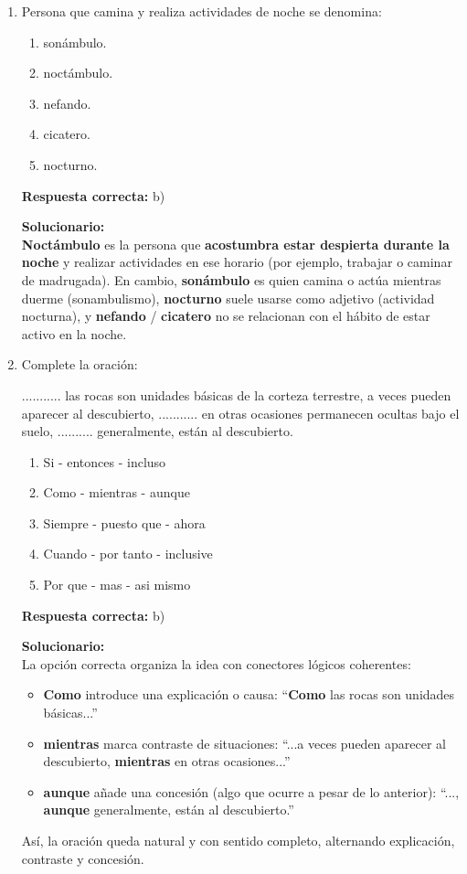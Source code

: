 \begin{enumerate}

\item Persona que camina y realiza actividades de noche se denomina:
\begin{enumerate}[label=\alph*)]
	\item sonámbulo.
	\item noctámbulo.
	\item nefando.
	\item cicatero.
	\item nocturno.
\end{enumerate}

\textbf{Respuesta correcta:} b)

\vspace{2mm}
\textbf{Solucionario:}\\
\textbf{Noctámbulo} es la persona que \textbf{acostumbra estar despierta durante la noche} y realizar actividades en ese horario (por ejemplo, trabajar o caminar de madrugada). 
En cambio, \textbf{sonámbulo} es quien camina o actúa mientras duerme (sonambulismo), \textbf{nocturno} suele usarse como adjetivo (actividad nocturna), y \textbf{nefando} / \textbf{cicatero} no se relacionan con el hábito de estar activo en la noche.

\item Complete la oración:

........... las rocas son unidades básicas de la corteza terrestre, a veces pueden aparecer al descubierto, ........... en otras ocasiones permanecen ocultas bajo el suelo, .......... generalmente, están al descubierto.

\begin{enumerate}[label=\alph*)]
	\item Si - entonces - incluso
	\item Como - mientras - aunque
	\item Siempre - puesto que - ahora
	\item Cuando - por tanto - inclusive
	\item Por que - mas - asi mismo
\end{enumerate}

\textbf{Respuesta correcta:} b)

\vspace{2mm}
\textbf{Solucionario:}\\
La opción correcta organiza la idea con conectores lógicos coherentes:
\begin{itemize}
	\item \textbf{Como} introduce una explicación o causa: “\textbf{Como} las rocas son unidades básicas...”
	\item \textbf{mientras} marca contraste de situaciones: “...a veces pueden aparecer al descubierto, \textbf{mientras} en otras ocasiones...”
	\item \textbf{aunque} añade una concesión (algo que ocurre a pesar de lo anterior): “..., \textbf{aunque} generalmente, están al descubierto.”
\end{itemize}
Así, la oración queda natural y con sentido completo, alternando explicación, contraste y concesión.


\end{enumerate}
